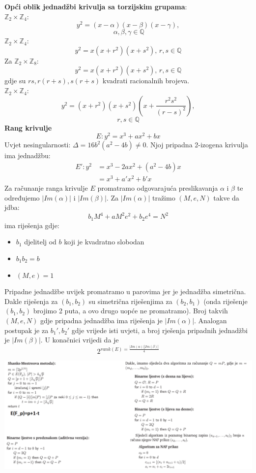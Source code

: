 \documentclass[12pt, a4paper]{article}
\begin{document}
\begin{multicols}{3}
\scriptsize
\noindent
\textbf{Opći oblik jednadžbi krivulja sa torzijskim grupama}:\\
$\mathbb{Z}_2 \times \mathbb{Z}_4$:
\[y^2=(x-\alpha)(x- \beta)(x-\gamma),\] \[\, \alpha,\beta,\gamma \in \mathbb{Q}\]
$\mathbb{Z}_2 \times \mathbb{Z}_4$:
\[y^2=x(x+r^2)(x+s^2), \, r,s \in \mathbb{Q}\]
Za $\mathbb{Z}_2 \times \mathbb{Z}_8$: 
\[y^2=x(x+r^2)(x+s^2), \, r,s \in \mathbb{Q}\]
gdje su $rs,r(r+s), s(r+s)$ kvadrati racionalnih brojeva.\\
$\mathbb{Z}_2 \times \mathbb{Z}_4$:
\[y^2=(x+r^2)(x+s^2)\left(x+\frac{r^2s^2}{(r-s)^2}\right),\]\[r,s \in \mathbb{Q}\]
\textbf{Rang krivulje} \[E: y^2=x^3+ax^2+bx\]
Uvjet nesingularnosti: $\Delta=16b^2(a^2-4b)\neq 0$. Njoj pripadna 2-izogena krivulja ima jednadžbu: \begin{align*}E': y^2&=x^3-2ax^2+(a^2-4b)x\\&=x^3+a'x^2+b'x
\end{align*}
Za računanje ranga krivulje $E$ promatramo odgovarajuća preslikavanja $\alpha$ i $\beta$ te određujemo $|Im(\alpha)|$ i $|Im(\beta)|$.
Za $|Im(\alpha)|$ tražimo $(M,e,N)$ takve da jdba:
\[b_1 M^4+aM^2e^2+b_2 e^4=N^2\]
ima riješenja gdje:
\begin{itemize}
\item $b_1$ djelitelj od $b$ koji je kvadratno slobodan
\item $b_1b_2=b$
\item $(M,e)=1$
\end{itemize}
Pripadne jednadžbe uvijek promatramo u parovima jer je jednadžba simetrična. Dakle riješenja za $(b_1,b_2)$ su simetrična riješenjima za $(b_2,b_1)$ (onda riješenje $(b_1,b_2)$ brojimo 2 puta, a ovo drugo uopće ne promatramo). Broj takvih $(M,e,N)$ gdje pripadna jednadžba ima riješenja je $|Im(\alpha)|$.  Analogan postupak je za $b_1', b_2'$ gdje vrijede isti uvjeti, a broj rješenja pripadnih jednadžbi je $|Im(\beta)|$. U konačnici vrijedi da je \[2^{rank(E)=\frac{|Im(\alpha)||Im(\beta)|}{4}}\]
\end{multicols}
\includegraphics[scale=0.4]{algovi.png}
\end{document}
